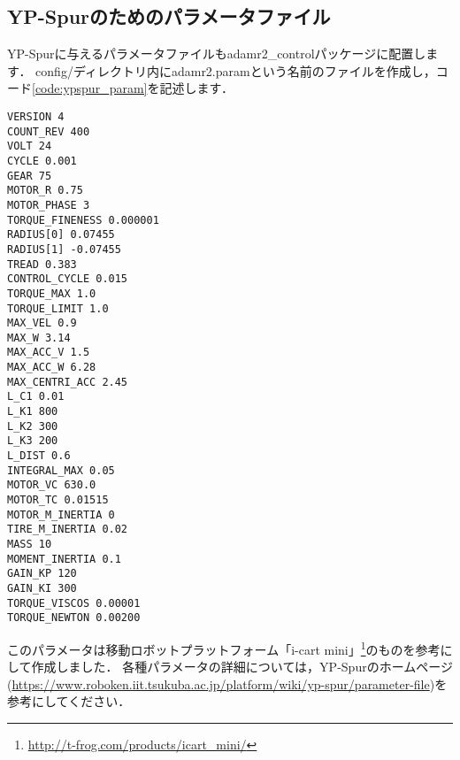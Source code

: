 \documentclass[{../../master}]{subfiles}
\begin{document}
\subsection{YP-Spurのためのパラメータファイル}

YP-Spurに与えるパラメータファイルも\textsf{adamr2\_control}パッケージに配置します．
\textsf{config/}ディレクトリ内に\textsf{adamr2.param}という名前のファイルを作成し，コード\ref{code:ypspur_param}を記述します．

\begin{lstlisting}[label=code:ypspur_param, caption=\textsf{adamr2.param}]
VERSION 4
COUNT_REV 400
VOLT 24
CYCLE 0.001
GEAR 75
MOTOR_R 0.75
MOTOR_PHASE 3
TORQUE_FINENESS 0.000001
RADIUS[0] 0.07455
RADIUS[1] -0.07455
TREAD 0.383
CONTROL_CYCLE 0.015
TORQUE_MAX 1.0
TORQUE_LIMIT 1.0
MAX_VEL 0.9
MAX_W 3.14
MAX_ACC_V 1.5
MAX_ACC_W 6.28
MAX_CENTRI_ACC 2.45
L_C1 0.01
L_K1 800
L_K2 300
L_K3 200
L_DIST 0.6
INTEGRAL_MAX 0.05
MOTOR_VC 630.0
MOTOR_TC 0.01515
MOTOR_M_INERTIA 0
TIRE_M_INERTIA 0.02
MASS 10
MOMENT_INERTIA 0.1
GAIN_KP 120
GAIN_KI 300
TORQUE_VISCOS 0.00001
TORQUE_NEWTON 0.00200
\end{lstlisting}

このパラメータは移動ロボットプラットフォーム「i-cart mini」\footnote{\url{http://t-frog.com/products/icart_mini/}}のものを参考にして作成しました．
各種パラメータの詳細については，YP-Spurのホームページ(\url{https://www.roboken.iit.tsukuba.ac.jp/platform/wiki/yp-spur/parameter-file})を参考にしてください．
\end{document}
